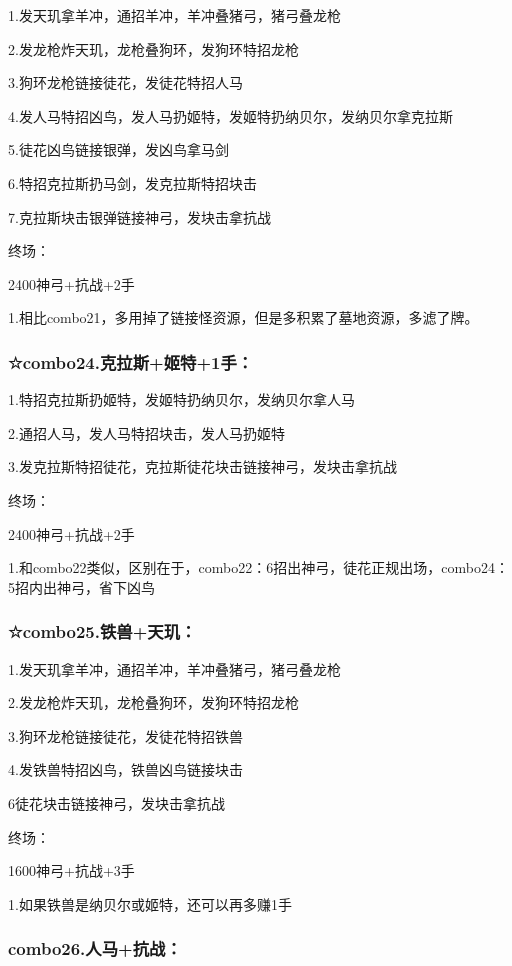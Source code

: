 \documentclass[
]{article}
\begin{document}
1.发天玑拿羊冲，通招羊冲，羊冲叠猪弓，猪弓叠龙枪

2.发龙枪炸天玑，龙枪叠狗环，发狗环特招龙枪

3.狗环龙枪链接徒花，发徒花特招人马

4.发人马特招凶鸟，发人马扔姬特，发姬特扔纳贝尔，发纳贝尔拿克拉斯

5.徒花凶鸟链接银弹，发凶鸟拿马剑

6.特招克拉斯扔马剑，发克拉斯特招块击

7.克拉斯块击银弹链接神弓，发块击拿抗战

终场：

2400神弓+抗战+2手

1.相比combo21，多用掉了链接怪资源，但是多积累了墓地资源，多滤了牌。

\hypertarget{combo24.ux514bux62c9ux65afux59ecux72791ux624b}{%
\subsubsection{☆combo24.克拉斯+姬特+1手：}\label{combo24.ux514bux62c9ux65afux59ecux72791ux624b}}

1.特招克拉斯扔姬特，发姬特扔纳贝尔，发纳贝尔拿人马

2.通招人马，发人马特招块击，发人马扔姬特

3.发克拉斯特招徒花，克拉斯徒花块击链接神弓，发块击拿抗战

终场：

2400神弓+抗战+2手

1.和combo22类似，区别在于，combo22：6招出神弓，徒花正规出场，combo24：5招内出神弓，省下凶鸟

\hypertarget{combo25.ux94c1ux517dux5929ux7391}{%
\subsubsection{☆combo25.铁兽+天玑：}\label{combo25.ux94c1ux517dux5929ux7391}}

1.发天玑拿羊冲，通招羊冲，羊冲叠猪弓，猪弓叠龙枪

2.发龙枪炸天玑，龙枪叠狗环，发狗环特招龙枪

3.狗环龙枪链接徒花，发徒花特招铁兽

4.发铁兽特招凶鸟，铁兽凶鸟链接块击

6徒花块击链接神弓，发块击拿抗战

终场：

1600神弓+抗战+3手

1.如果铁兽是纳贝尔或姬特，还可以再多赚1手

\hypertarget{combo26.ux4ebaux9a6cux6297ux6218}{%
\subsubsection{combo26.人马+抗战：}\label{combo26.ux4ebaux9a6cux6297ux6218}}
\end{document}
